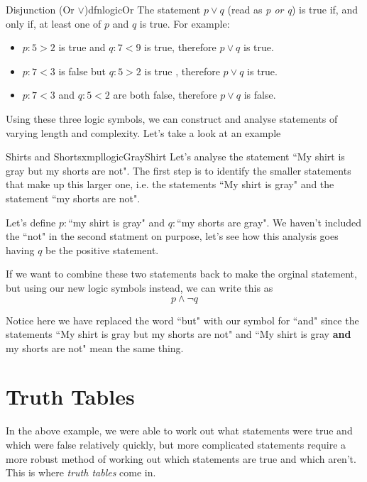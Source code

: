 \begin{dfn}[label={def:logicOr}]{Disjunction (Or $\lor$)}{dfnlogicOr}
    The statement $p \lor q$ (read as \emph{p or q}) is true if, and only if, at least one of $p$ and $q$ is true. For example:
    \begin{itemize}
        \item $p:5 > 2$ is true and $q: 7< 9$ is true, therefore $p \lor q$ is true.
        \item $p: 7< 3$ is false but $q:5 > 2$ is true , therefore $p \lor q$ is true.
        \item $p:7 < 3$ and $q: 5 < 2$ are both false, therefore $p \lor q$ is false.
    \end{itemize}
\end{dfn}

Using these three logic symbols, we can construct and analyse statements of varying length and complexity. Let's take a look at an example

\begin{exmpl}[label={exmpl:logicGrayShirt}]{Shirts and Shorts}{xmpllogicGrayShirt}
    Let's analyse the statement ``My shirt is gray but my shorts are not". The first step is to identify the smaller statements that make up this larger one, i.e. the statements ``My shirt is gray" and the statement ``my shorts are not".

    Let's define $p:$``my shirt is gray" and $q:$``my shorts are gray". We haven't included the ``not" in the second statment on purpose, let's see how this analysis goes having $q$ be the positive statement.

    If we want to combine these two statements back to make the orginal statement, but using our new logic symbols instead, we can write this as
    $$ p \land \lnot q$$

    Notice here we have replaced the word ``but" with our symbol for ``and" since the statements  ``My shirt is gray but my shorts are not" and ``My shirt is gray \textbf{and} my shorts are not" mean the same thing.
\end{exmpl}

\section{Truth Tables}
In the above example, we were able to work out what statements were true and which were false relatively quickly, but more complicated statements require a more robust method of working out which statements are true and which aren't. This is where \emph{truth tables} come in.

